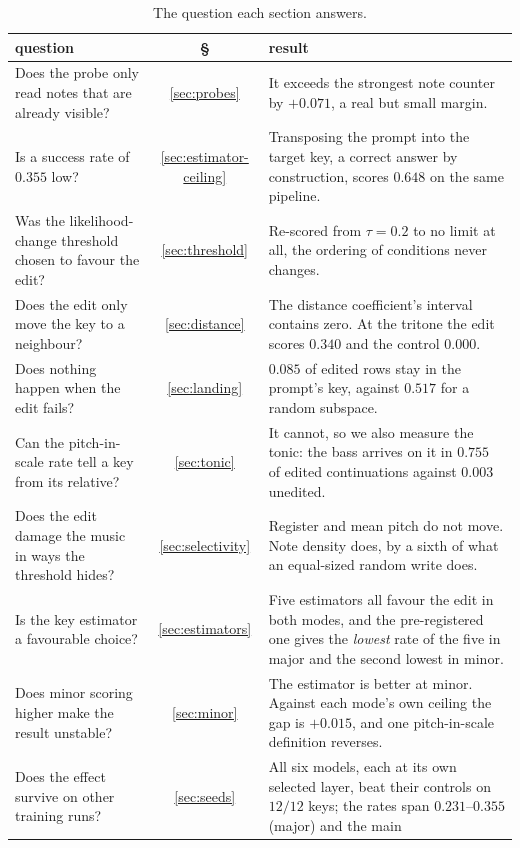 \documentclass{article}
\begin{document}
\begin{table}[!h]
\centering
\caption{The question each section answers.}
\footnotesize
\setlength{\tabcolsep}{3.5pt}
\begin{tabular}{@{}p{}cp{}@{}}
\toprule
question & § & result\\
\midrule
Does the probe only read notes that are already visible?
 & \ref{sec:probes} & It exceeds the strongest note counter by $+0.071$, a real
   but small margin.\\
Is a success rate of $0.355$ low?
 & \ref{sec:estimator-ceiling} & Transposing the prompt into the target key, a
   correct answer by construction, scores $0.648$ on the same pipeline.\\
Was the likelihood-change threshold chosen to favour the edit?
 & \ref{sec:threshold} & Re-scored from $\tau=0.2$ to no limit at all, the ordering
   of conditions never changes.\\
Does the edit only move the key to a neighbour?
 & \ref{sec:distance} & The distance coefficient's interval contains zero. At the
   tritone the edit scores $0.340$ and the control $0.000$.\\
Does nothing happen when the edit fails?
 & \ref{sec:landing} & $0.085$ of edited rows stay in the prompt's key, against
   $0.517$ for a random subspace.\\
Can the pitch-in-scale rate tell a key from its relative?
 & \ref{sec:tonic} & It cannot, so we also measure the tonic: the bass arrives
   on it in $0.755$ of edited continuations against $0.003$ unedited.\\
Does the edit damage the music in ways the threshold hides?
 & \ref{sec:selectivity} & Register and mean pitch do not move. Note density does,
   by a sixth of what an equal-sized random write does.\\
Is the key estimator a favourable choice?
 & \ref{sec:estimators} & Five estimators all favour the edit in both modes, and
   the pre-registered one gives the \emph{lowest} rate of the five in major and
   the second lowest in minor.\\
Does minor scoring higher make the result unstable?
 & \ref{sec:minor} & The estimator is better at minor. Against each mode's own
   ceiling the gap is $+0.015$, and one pitch-in-scale definition reverses.\\
Does the effect survive on other training runs?
 & \ref{sec:seeds} & All six models, each at its own selected layer, beat their
   controls on $12/12$ keys; the rates span $0.231$--$0.355$ (major) and the main

\end{tabular}
\end{table}
\end{document}
